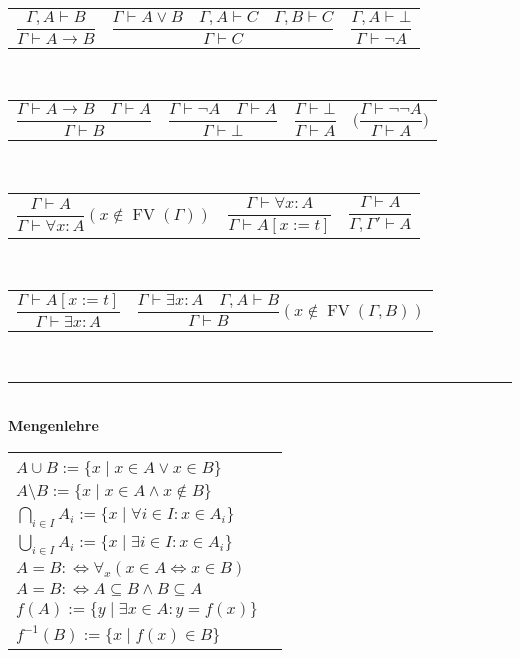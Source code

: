 \documentclass[a4paper,10pt,fleqn,twoside,twocolumn,dvipdfmx]{scrartcl}
\newcommand{\strong}[1]{\textsf{\textbf{#1}}}
\begin{document}
\begin{tabular}{@{}lll}
$\dfrac{\Gamma, A\vdash B}{\Gamma\vdash A\to B}$
& $\dfrac{\Gamma\vdash A\lor B\quad\Gamma,A\vdash C\quad\Gamma,B\vdash C}{\Gamma\vdash C}$
& $\dfrac{\Gamma,A\vdash\bot}{\Gamma\vdash\neg A}$
\end{tabular}\\[6pt]
\begin{tabular}{@{}l@{\quad}l@{\quad}l@{\quad}l}
$\dfrac{\Gamma\vdash A\to B\quad\Gamma\vdash A}{\Gamma\vdash B}$
& $\dfrac{\Gamma\vdash\neg A\quad\Gamma\vdash A}{\Gamma\vdash\bot}$
& $\dfrac{\Gamma\vdash\bot}{\Gamma\vdash A}$
& $\bigg(\dfrac{\Gamma\vdash\neg\neg A}{\Gamma\vdash A}\bigg)$
\end{tabular}\\[6pt]
\begin{tabular}{@{}l@{\qquad}l@{\qquad}l}
$\dfrac{\Gamma\vdash A}{\Gamma\vdash\forall x\colon A}(x\notin\operatorname{FV}(\Gamma))$
& $\dfrac{\Gamma\vdash\forall x\colon A}{\Gamma\vdash A[x:=t]}$
& $\dfrac{\Gamma\vdash A}{\Gamma,\Gamma'\vdash A}$
\end{tabular}\\[6pt]
\begin{tabular}{@{}l@{\qquad}l}
$\dfrac{\Gamma\vdash A[x:=t]}{\Gamma\vdash\exists x\colon A}$
& $\dfrac{\Gamma\vdash\exists x\colon A\quad\Gamma,A\vdash B}{\Gamma\vdash B}
(x\notin\operatorname{FV}(\Gamma, B))$
\end{tabular}\\[6pt]
\rule{\columnwidth}{\heavyrulewidth}\\
\strong{Mengenlehre}\\[2pt]
\begin{tabular}{@{}l@{\;\,}|@{\;\;}l}
\makecell[lt]{
$A\cap B := \{x\mid x\in A\land x\in B\}$\\
$A\cup B := \{x\mid x\in A\lor x\in B\}$\\
$A\setminus B := \{x\mid x\in A\land x\notin B\}$\\
$\bigcap_{i\in I} A_i := \{x\mid \forall i{\in}I\colon x{\in}A_i\}$\\
$\bigcup_{i\in I} A_i := \{x\mid \exists i{\in}I\colon x{\in}A_i\}$
}
&\makecell[lt]{
$A\subseteq B :\Leftrightarrow \forall_{\!x}(x\in A\Rightarrow x\in B)$\\
$A=B :\Leftrightarrow \forall_{\!x}(x\in A\Leftrightarrow x\in B)$\\
$A=B :\Leftrightarrow A\subseteq B\land B\subseteq A$\\
$f(A) := \{y\mid\exists x{\in}A\colon y{=}f(x)\}$\\
$f^{-1}(B) := \{x\mid f(x)\in B\}$
}
\end{tabular}\\
\end{document}
